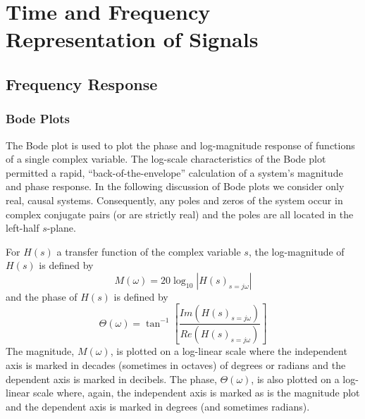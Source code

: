 
\chapter[Representation of Signals]{Time and Frequency Representation of Signals}

\section{Frequency Response}
\subsection{Bode Plots}
\label{bode}

	The Bode plot is used to plot the phase
and log-magnitude response of functions of a single
complex variable. The log-scale characteristics
of the Bode plot permitted a rapid, ``back-of-the-envelope''
calculation of a system's magnitude and
phase response.  In the  following discussion of Bode plots
we consider only real, causal systems.
Consequently, any poles and zeros of the system occur
in complex conjugate pairs (or are strictly real) and
the poles are all located in the left-half $s$-plane.

	For $H(s)$ a transfer function 
of the complex variable $s$, the 
log-magnitude of $H(s)$ is defined by
%
\begin{equation}
M(\omega)=20\log_{10}|H(s)_{s=j\omega}|
\label{e.bode1}
\end{equation}
%
and the phase of $H(s)$ is defined by
%
\begin{equation}
\Theta(\omega)=\tan^{-1}[\frac{Im(H(s)_{s=j\omega})}{Re(H(s)_{s=j\omega})}]
\label{e.bode2}
\end{equation}
%
The magnitude, $M(\omega)$, is plotted on a log-linear scale
where the independent axis is marked in decades (sometimes
in octaves) of degrees or radians and the dependent axis is marked
in decibels.  The phase, $\Theta(\omega)$, is also plotted on a log-linear
scale where, again, the independent axis is marked as is the magnitude plot
and the dependent axis is marked in degrees (and sometimes radians).

